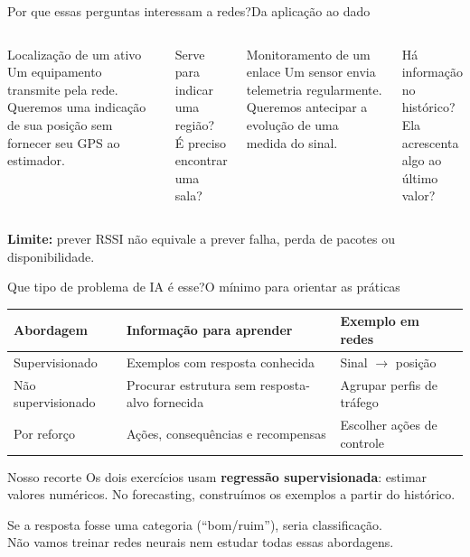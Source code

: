 \begin{frame}{Por que essas perguntas interessam a redes?}{Da aplicação ao dado}
\begin{columns}[T]
\begin{block}{Localização de um ativo}
Um equipamento transmite pela rede. Queremos uma indicação de sua posição sem fornecer seu GPS ao estimador.
\end{block}
Serve para indicar uma região?\\
É preciso encontrar uma sala?
\begin{block}{Monitoramento de um enlace}
Um sensor envia telemetria regularmente. Queremos antecipar a evolução de uma medida do sinal.
\end{block}
Há informação no histórico?\\
Ela acrescenta algo ao último valor?
\end{columns}
\vspace{3mm}
\textbf{Limite:} prever RSSI não equivale a prever falha, perda de pacotes ou disponibilidade.
\end{frame}

\begin{frame}{Que tipo de problema de IA é esse?}{O mínimo para orientar as práticas}
\small
\begin{tabular}{p{3cm}p{5cm}p{4cm}}
\toprule
Abordagem & Informação para aprender & Exemplo em redes\\
\midrule
Supervisionado & Exemplos com resposta conhecida & Sinal $\rightarrow$ posição\\[2mm]
Não supervisionado & Procurar estrutura sem resposta-alvo fornecida & Agrupar perfis de tráfego\\[2mm]
Por reforço & Ações, consequências e recompensas & Escolher ações de controle\\
\bottomrule
\end{tabular}
\vspace{4mm}
\begin{block}{Nosso recorte}
Os dois exercícios usam \textbf{regressão supervisionada}: estimar valores numéricos.
No forecasting, construímos os exemplos a partir do histórico.
\end{block}
Se a resposta fosse uma categoria (``bom/ruim''), seria classificação.\\
Não vamos treinar redes neurais nem estudar todas essas abordagens.
\end{frame}


